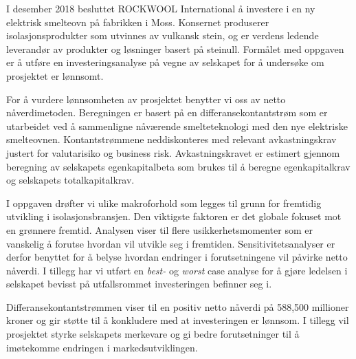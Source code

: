 I desember 2018 besluttet ROCKWOOL International å investere i en ny elektrisk smelteovn på fabrikken i Moss. Konsernet produserer isolasjonsprodukter som utvinnes av vulkansk stein, og er verdens ledende leverandør av produkter og løsninger basert på steinull. Formålet med oppgaven er å utføre en investeringsanalyse på vegne av selskapet for å undersøke om prosjektet er lønnsomt. 

\indent \newline
For å vurdere lønnsomheten av prosjektet benytter vi oss av netto nåverdimetoden. Beregningen er basert på en differansekontantstrøm som er utarbeidet ved å sammenligne nåværende smelteteknologi med den nye elektriske smelteovnen. Kontantstrømmene neddiskonteres med relevant avkastningskrav justert for valutarisiko og business risk. Avkastningskravet er estimert gjennom beregning av selskapets egenkapitalbeta som brukes til å beregne egenkapitalkrav og selskapets totalkapitalkrav.

\indent \newline
I oppgaven drøfter vi ulike makroforhold som legges til grunn for fremtidig utvikling i isolasjonsbransjen. Den viktigste faktoren er det globale fokuset mot en grønnere fremtid. Analysen viser til flere usikkerhetsmomenter som er vanskelig å forutse hvordan vil utvikle seg i fremtiden. Sensitivitetsanalyser er derfor benyttet for å belyse hvordan endringer i forutsetningene vil påvirke netto nåverdi. I tillegg har vi utført en \textit{best-} og \textit{worst} case analyse for å gjøre ledelsen i selskapet bevisst på utfallsrommet investeringen befinner seg i.

\indent \newline
Differansekontantstrømmen  viser til en positiv netto nåverdi på 588,500 millioner kroner og gir støtte til å konkludere med at investeringen er lønnsom. I tillegg vil prosjektet styrke selskapets merkevare og gi bedre forutsetninger til å imøtekomme endringen i markedsutviklingen.
